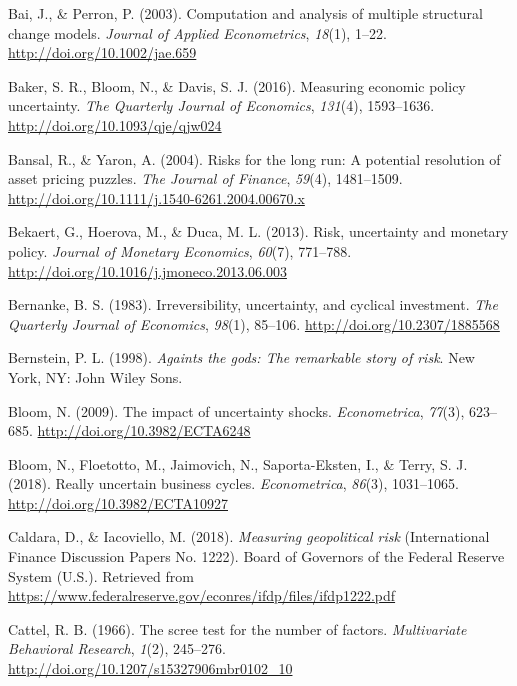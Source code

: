\documentclass[12pt,twoside]{reedthesis}
\begin{document}
\leavevmode\hypertarget{ref-baiperr:2003}{}%
Bai, J., \& Perron, P. (2003). Computation and analysis of multiple structural change models. \emph{Journal of Applied Econometrics}, \emph{18}(1), 1--22. \url{http://doi.org/10.1002/jae.659}

\leavevmode\hypertarget{ref-bakeetal:2016}{}%
Baker, S. R., Bloom, N., \& Davis, S. J. (2016). Measuring economic policy uncertainty. \emph{The Quarterly Journal of Economics}, \emph{131}(4), 1593--1636. \url{http://doi.org/10.1093/qje/qjw024}

\leavevmode\hypertarget{ref-bansyaro:2004}{}%
Bansal, R., \& Yaron, A. (2004). Risks for the long run: A potential resolution of asset pricing puzzles. \emph{The Journal of Finance}, \emph{59}(4), 1481--1509. \url{http://doi.org/10.1111/j.1540-6261.2004.00670.x}

\leavevmode\hypertarget{ref-bekaetal:2013}{}%
Bekaert, G., Hoerova, M., \& Duca, M. L. (2013). Risk, uncertainty and monetary policy. \emph{Journal of Monetary Economics}, \emph{60}(7), 771--788. \url{http://doi.org/10.1016/j.jmoneco.2013.06.003}

\leavevmode\hypertarget{ref-bernanke:1983}{}%
Bernanke, B. S. (1983). Irreversibility, uncertainty, and cyclical investment. \emph{The Quarterly Journal of Economics}, \emph{98}(1), 85--106. \url{http://doi.org/10.2307/1885568}

\leavevmode\hypertarget{ref-bernstein:1998}{}%
Bernstein, P. L. (1998). \emph{Againts the gods: The remarkable story of risk}. New York, NY: John Wiley Sons.

\leavevmode\hypertarget{ref-bloom:2009}{}%
Bloom, N. (2009). The impact of uncertainty shocks. \emph{Econometrica}, \emph{77}(3), 623--685. \url{http://doi.org/10.3982/ECTA6248}

\leavevmode\hypertarget{ref-blooetal:2018}{}%
Bloom, N., Floetotto, M., Jaimovich, N., Saporta-Eksten, I., \& Terry, S. J. (2018). Really uncertain business cycles. \emph{Econometrica}, \emph{86}(3), 1031--1065. \url{http://doi.org/10.3982/ECTA10927}

\leavevmode\hypertarget{ref-caldiaco:2018}{}%
Caldara, D., \& Iacoviello, M. (2018). \emph{Measuring geopolitical risk} (International Finance Discussion Papers No. 1222). Board of Governors of the Federal Reserve System (U.S.). Retrieved from \url{https://www.federalreserve.gov/econres/ifdp/files/ifdp1222.pdf}

\leavevmode\hypertarget{ref-cattel:1966}{}%
Cattel, R. B. (1966). The scree test for the number of factors. \emph{Multivariate Behavioral Research}, \emph{1}(2), 245--276. \url{http://doi.org/10.1207/s15327906mbr0102_10}
\end{document}

